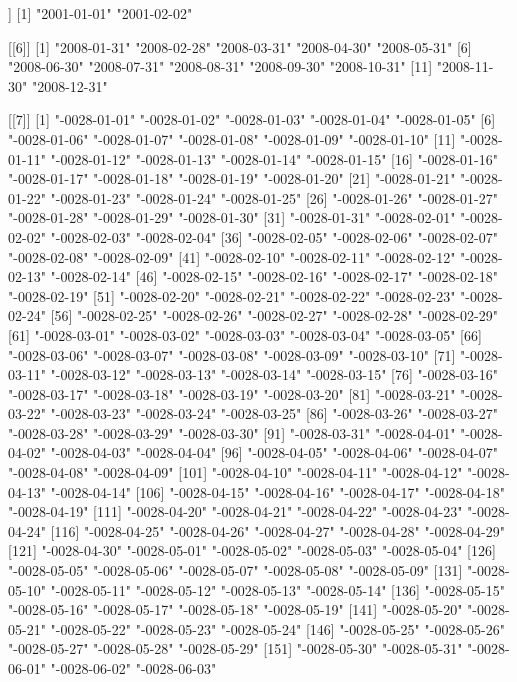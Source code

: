 \documentclass[
]{jss}
\begin{document}
\begin{CodeChunk}
\begin{CodeOutput}
[[5]]
[1] "2001-01-01" "2001-02-02"

[[6]]
 [1] "2008-01-31" "2008-02-28" "2008-03-31" "2008-04-30" "2008-05-31"
 [6] "2008-06-30" "2008-07-31" "2008-08-31" "2008-09-30" "2008-10-31"
[11] "2008-11-30" "2008-12-31"

[[7]]
  [1] "-0028-01-01" "-0028-01-02" "-0028-01-03" "-0028-01-04" "-0028-01-05"
  [6] "-0028-01-06" "-0028-01-07" "-0028-01-08" "-0028-01-09" "-0028-01-10"
 [11] "-0028-01-11" "-0028-01-12" "-0028-01-13" "-0028-01-14" "-0028-01-15"
 [16] "-0028-01-16" "-0028-01-17" "-0028-01-18" "-0028-01-19" "-0028-01-20"
 [21] "-0028-01-21" "-0028-01-22" "-0028-01-23" "-0028-01-24" "-0028-01-25"
 [26] "-0028-01-26" "-0028-01-27" "-0028-01-28" "-0028-01-29" "-0028-01-30"
 [31] "-0028-01-31" "-0028-02-01" "-0028-02-02" "-0028-02-03" "-0028-02-04"
 [36] "-0028-02-05" "-0028-02-06" "-0028-02-07" "-0028-02-08" "-0028-02-09"
 [41] "-0028-02-10" "-0028-02-11" "-0028-02-12" "-0028-02-13" "-0028-02-14"
 [46] "-0028-02-15" "-0028-02-16" "-0028-02-17" "-0028-02-18" "-0028-02-19"
 [51] "-0028-02-20" "-0028-02-21" "-0028-02-22" "-0028-02-23" "-0028-02-24"
 [56] "-0028-02-25" "-0028-02-26" "-0028-02-27" "-0028-02-28" "-0028-02-29"
 [61] "-0028-03-01" "-0028-03-02" "-0028-03-03" "-0028-03-04" "-0028-03-05"
 [66] "-0028-03-06" "-0028-03-07" "-0028-03-08" "-0028-03-09" "-0028-03-10"
 [71] "-0028-03-11" "-0028-03-12" "-0028-03-13" "-0028-03-14" "-0028-03-15"
 [76] "-0028-03-16" "-0028-03-17" "-0028-03-18" "-0028-03-19" "-0028-03-20"
 [81] "-0028-03-21" "-0028-03-22" "-0028-03-23" "-0028-03-24" "-0028-03-25"
 [86] "-0028-03-26" "-0028-03-27" "-0028-03-28" "-0028-03-29" "-0028-03-30"
 [91] "-0028-03-31" "-0028-04-01" "-0028-04-02" "-0028-04-03" "-0028-04-04"
 [96] "-0028-04-05" "-0028-04-06" "-0028-04-07" "-0028-04-08" "-0028-04-09"
[101] "-0028-04-10" "-0028-04-11" "-0028-04-12" "-0028-04-13" "-0028-04-14"
[106] "-0028-04-15" "-0028-04-16" "-0028-04-17" "-0028-04-18" "-0028-04-19"
[111] "-0028-04-20" "-0028-04-21" "-0028-04-22" "-0028-04-23" "-0028-04-24"
[116] "-0028-04-25" "-0028-04-26" "-0028-04-27" "-0028-04-28" "-0028-04-29"
[121] "-0028-04-30" "-0028-05-01" "-0028-05-02" "-0028-05-03" "-0028-05-04"
[126] "-0028-05-05" "-0028-05-06" "-0028-05-07" "-0028-05-08" "-0028-05-09"
[131] "-0028-05-10" "-0028-05-11" "-0028-05-12" "-0028-05-13" "-0028-05-14"
[136] "-0028-05-15" "-0028-05-16" "-0028-05-17" "-0028-05-18" "-0028-05-19"
[141] "-0028-05-20" "-0028-05-21" "-0028-05-22" "-0028-05-23" "-0028-05-24"
[146] "-0028-05-25" "-0028-05-26" "-0028-05-27" "-0028-05-28" "-0028-05-29"
[151] "-0028-05-30" "-0028-05-31" "-0028-06-01" "-0028-06-02" "-0028-06-03"

\end{CodeOutput}
\end{CodeChunk}
\end{document}
